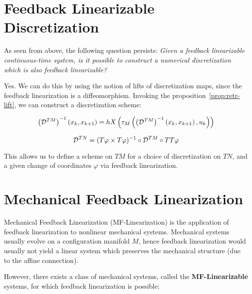 \section{Feedback Linearizable Discretization}

As seen from above, the following question persists: \textsl{Given a feedback linearizable continuous-time system, is it possible to construct a numerical discretization which is also feedback linearizable?}

Yes. We can do this by using the notion of lifts of discretization maps, since the feedback linearization is a diffeomorphism. Invoking the proposition~\eqref{prop:retr-lift}, we can construct a discretization scheme:

\begin{equation}
    \left(\mathcal{D}^{TM}\right)^{-1}(x_k, x_{k+1}) = hX \left( \tau_M \left( \left( \mathcal{D}^{TM} \right)^{-1} \left( x_k, x_{k+1}\right), u_k  \right) \right) 
\end{equation}

\begin{equation}
    \mathcal{D}^{TN} = (T\varphi \times T \varphi)^{-1} \circ \mathcal{D}^{TM} \circ TT \varphi
\end{equation}

This allows us to define a scheme on $TM$ for a choice of discretization on $TN$, and a given change of coordinates $\varphi$ via feedback linearization.


\section{Mechanical Feedback Linearization}
Mechanical Feedback Linearization (MF-Linearization) is the application of feedback linearization to nonlinear mechanical systems. Mechanical systems usually evolve on a configuration manifold $M$, hence feedback linearization would usually not yield a linear system which preserves the mechanical structure (due to the affine connection). 

However, there exists a class of mechanical systems, called the \textbf{MF-Linearizable} systems, for which feedback linearization is possible:

